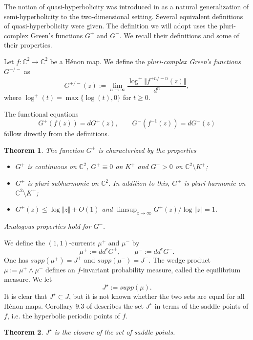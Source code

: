\documentclass[10pt,a4paper]{article}
\newtheorem{theorem}{Theorem}[section]
\newenvironment{definition}[1][Definition]{\begin{trivlist}
\item[\hskip \labelsep {\bfseries #1}]}{\end{trivlist}}
\begin{document}
The notion of quasi-hyperbolicity was introduced in \cite{BS8} as a natural generalization of semi-hyperbolicity to the two-dimensional setting.  Several equivalent definitions of quasi-hyperbolicity were given. The definition we will adopt uses the pluri-complex Green's functions $G^+$ and $G^-$. We recall their definitions and some of their properties.

\begin{definition}
Let $f:\mathbb C^2\rightarrow \mathbb C^2$ be a H\'enon map. We define the \textit{pluri-complex Green's functions} $G^{+/-}$ as
\[
G^{+/-}(z):=\lim_{n\to\infty} \frac{\log^+ \Vert f^{+n/-n}(z)\Vert}{d^n},
\]
where $\log^+(t)=\max\{\log(t),0\}$ for $t\geq 0$.
\end{definition}

The functional equations
\[
G^+(f(z))=dG^+(z),\qquad G^-(f^{-1}(z))=dG^-(z)
\]
follow directly from the definitions.

\begin{theorem}
The function $G^+$ is characterized by the properties
\begin{itemize}
\item $G^+$ is continuous on $\mathbb C^2$, $G^+ \equiv 0$ on $K^+$ and $G^+>0$ on $\mathbb C^2\setminus K^+$;
\item $G^+$ is pluri-subharmonic on $\mathbb C^2$. In addition to this, $G^+$ is pluri-harmonic on $\mathbb C^2\setminus K^+$;
\item $G^+(z)\leq \log\Vert z\Vert+O(1)$ and $\limsup_{z\to\infty}G^+(z)/\log\Vert z\Vert=1$.
\end{itemize}
Analogous properties hold for $G^-$.
\end{theorem}

We define the $(1,1)$-currents $\mu^+$ and $\mu^-$ by
\begin{equation}
\label{currents}
\mu^+:=dd^c G^+,\qquad \mu^-:=dd^c G^-.
\end{equation}
One has $supp(\mu^+)=J^+$ and $supp(\mu^-)=J^-$. The wedge product $\mu:=\mu^+\wedge\mu^-$ defines an $f$-invariant probability measure, called the equilibrium measure. We let
\[
J^\star:=supp(\mu).
\]
It is clear that $J^\star\subset J$, but it is not known whether the two sets are equal for all H\'enon maps. Corollary 9.3 of \cite{BLS} describes the set $J^\star$ in terms of the saddle points of $f$, i.e. the hyperbolic periodic points of $f$.
\begin{theorem}
\label{closuresaddle}
$J^\star$ is the closure of the set of saddle points.
\end{theorem}
\end{document}
